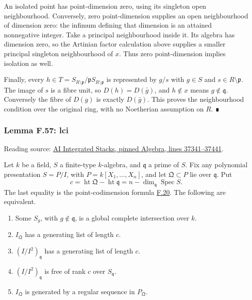 \documentclass[11pt,a4paper,openany]{report}
\providecommand{\tightlist}{\setlength{\itemsep}{0pt}\setlength{\parskip}{0pt}}
\begin{document}
An isolated point has point-dimension zero, using its singleton open neighbourhood. Conversely, zero point-dimension supplies an open neighbourhood of dimension zero: the infimum defining that dimension is an attained nonnegative integer. Take a principal neighbourhood inside it. Its algebra has dimension zero, so the Artinian factor calculation above supplies a smaller principal singleton neighbourhood of \(x\). Thus zero point-dimension implies isolation as well.

Finally, every \(h\in T=S_{R\setminus\mathfrak p}/\mathfrak pS_{R\setminus\mathfrak p}\) is represented by \(g/s\) with \(g\in S\) and \(s\in R\setminus\mathfrak p\). The image of \(s\) is a fibre unit, so \(D(h)=D(\bar g)\), and \(h\notin x\) means \(g\notin\mathfrak q\). Conversely the fibre of \(D(g)\) is exactly \(D(\bar g)\). This proves the neighbourhood condition over the original ring, with no Noetherian assumption on \(R\). ∎

\label{AG-RG-S05-algebra-lemma-lci}

\subsubsection{Lemma F.57: lci}\label{AG-RG-S05-lemma-f.57-lci}

Reading source: \href{https://github.com/KokunoYumeto/unofficial-stacks-project-ai-drafts/blob/565b10e987aba5969b21145a0833f42d69f96790/algebra.tex\#L37341-L37441}{AI Integrated Stacks, pinned Algebra, lines 37341--37441}.

Let \(k\) be a field, \(S\) a finite-type \(k\)-algebra, and \(\mathfrak q\) a prime of \(S\). Fix any polynomial presentation \(S=P/I\), with \(P=k[X_1,\ldots,X_n]\), and let \(\mathfrak Q\subset P\) lie over \(\mathfrak q\). Put \[c=\operatorname{ht}\mathfrak Q-\operatorname{ht}\mathfrak q
=n-\dim_{\mathfrak q}\operatorname{Spec}S.\] The last equality is the point-codimension formula \hyperref[AG-RG-S05-algebra-lemma-codimension]{F.20}. The following are equivalent.

\begin{enumerate}
\def\labelenumi{\arabic{enumi}.}
\tightlist
\item
  Some \(S_g\), with \(g\notin\mathfrak q\), is a global complete intersection over \(k\).
\item
  \(I_{\mathfrak Q}\) has a generating list of length \(c\).
\item
  \((I/I^2)_{\mathfrak q}\) has a generating list of length \(c\).
\item
  \((I/I^2)_{\mathfrak q}\) is free of rank \(c\) over \(S_{\mathfrak q}\).
\item
  \(I_{\mathfrak Q}\) is generated by a regular sequence in \(P_{\mathfrak Q}\).
\end{enumerate}
\end{document}
